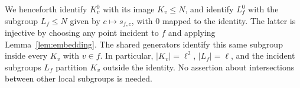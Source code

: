 We henceforth identify $K_v^0$ with its image $K_v\le N$, and identify
$L_f^0$ with the subgroup $L_f\le N$ given by $c\mapsto s_{f,c}$,
with $0$ mapped to the identity.  The latter is injective by choosing
any point incident to $f$ and applying Lemma~\ref{lem:embedding}.
The shared generators identify this same subgroup inside every
$K_v$ with $v\in f$.  In particular, $|K_v|=\ell^2$, $|L_f|=\ell$,
and the incident subgroups $L_f$ partition $K_v$ outside the
identity.  No assertion about intersections between other local
subgroups is needed.
